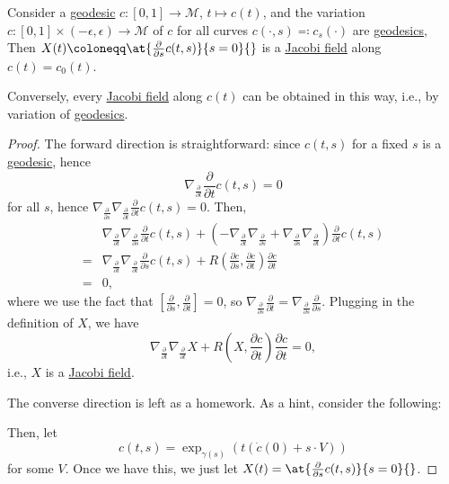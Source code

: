 \begin{theorem}\label{thm:lec18}
	Consider a \hyperref[def:geodesic]{geodesic} \(c\colon [0, 1] \to \mathcal{M} \), \(t \mapsto c(t)\), and the variation \(c\colon [0, 1] \times (-\epsilon , \epsilon ) \to \mathcal{M} \) of \(c\) for all curves \(c(\cdot, s) \eqqcolon c_s(\cdot)\) are \hyperref[def:geodesic]{geodesics}, Then \(X(t) \coloneqq \at{\frac{\partial }{\partial s} c(t, s)}{s=0}{} \) is a \hyperref[def:Jacobi-field]{Jacobi field} along \(c(t) = c_0(t)\).

	Conversely, every \hyperref[def:Jacobi-field]{Jacobi field} along \(c(t)\) can be obtained in this way, i.e., by variation of \hyperref[def:geodesic]{geodesics}.
\end{theorem}
\begin{proof}
	The forward direction is straightforward: since \(c(t, s)\) for a fixed \(s\) is a \hyperref[def:geodesic]{geodesic}, hence
	\[
		\nabla _{\frac{\partial }{\partial t} }\frac{\partial }{\partial t} c(t, s) = 0
	\]
	for all \(s\), hence \(\nabla _{\frac{\partial }{\partial s} } \nabla _{\frac{\partial }{\partial t} } \frac{\partial }{\partial t} c(t, s) = 0\). Then,
	\[
		\begin{split}
			&\nabla _{\frac{\partial }{\partial t} }\nabla _{\frac{\partial }{\partial s} }\frac{\partial }{\partial t} c(t, s)
			+ \left( - \nabla _{\frac{\partial }{\partial t} } \nabla _{\frac{\partial }{\partial s} } + \nabla _{\frac{\partial }{\partial s} } \nabla _{\frac{\partial }{\partial t} } \right) \frac{\partial }{\partial t} c(t, s)\\
			=& \nabla _{\frac{\partial }{\partial t} }\nabla _{\frac{\partial }{\partial t} } \frac{\partial }{\partial s} c(t, s) + R\left( \frac{\partial c}{\partial s} , \frac{\partial c}{\partial t} \right) \frac{\partial c}{\partial t}\\
			=& 0,
		\end{split}
	\]
	where we use the fact that \([\frac{\partial }{\partial s} , \frac{\partial }{\partial t} ] = 0\), so \(\nabla _{\frac{\partial }{\partial s} } \frac{\partial }{\partial t} = \nabla _{\frac{\partial }{\partial s} } \frac{\partial }{\partial s} \). Plugging in the definition of \(X\), we have
	\[
		\nabla _{\frac{\partial }{\partial t} }\nabla _{\frac{\partial }{\partial t} } X
		+ R\left( X, \frac{\partial c}{\partial t} \right) \frac{\partial c}{\partial t} = 0,
	\]
	i.e., \(X\) is a \hyperref[def:Jacobi-field]{Jacobi field}.

	The converse direction is left as a homework. As a hint, consider the following:
	\begin{center}
	\end{center}
	Then, let
	\[
		c(t, s) = \exp _{\gamma (s)} \left( t(\dot{c} (0) + s\cdot V) \right)
	\]
	for some \(V\). Once we have this, we just let \(X (t)= \at{\frac{\partial }{\partial s} c(t, s)}{s = 0}{} \).
\end{proof}

